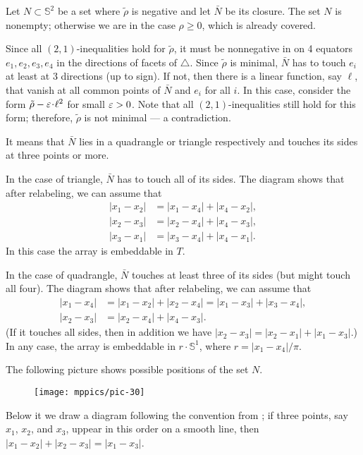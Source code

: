 \documentclass[a4paper,10pt]{article}
\begin{document}
Let $N\subset \mathbb{S}^2$ be a set where $\tilde\rho$ is negative and let $\bar N$ be its closure.
The set $N$ is nonempty; otherwise we are in the case $\rho\ge 0$, which is already covered.

Since all $(2,1)$-inequalities hold for $\tilde\rho$,
it must be nonnegative in on 4 equators $e_1,e_2,e_3,e_4$ in the directions of facets of $\triangle$.
Since $\tilde\rho$ is minimal, $\bar N$ has to touch $e_i$ at least at 3 directions (up to sign). 
If not, then there is a linear function, say $\ell$, that vanish at all common points of $\bar N$ and $e_i$ for all $i$.
In this case, consider the form $\tilde\rho-\eps\cdot \ell^2$ for small $\varepsilon>0$.
Note that all $(2,1)$-inequalities still hold for this form;
therefore, $\tilde\rho$ is not minimal --- a contradiction.

It means that $\bar N$ lies in a quadrangle or triangle respectively and touches its sides at three points or more.

In the case of triangle, $\bar N$ has to touch all of its sides.
The diagram shows that after relabeling, we can assume that 
\begin{align*}
|x_1-x_2|&=|x_1-x_4|+|x_4-x_2|,
\\
|x_2-x_3|&=|x_2-x_4|+|x_4-x_3|,
\\
|x_3-x_1|&=|x_3-x_4|+|x_4-x_1|.
\end{align*}
In this case the array is embeddable in $T$.

In the case of quadrangle, $\bar N$ touches at least three of its sides (but might touch all four).
The diagram shows that after relabeling, we can assume that 
\begin{align*}
|x_1-x_4|&=|x_1-x_2|+|x_2-x_4|=|x_1-x_3|+|x_3-x_4|,
\\
|x_2-x_3|&=|x_2-x_4|+|x_4-x_3|.
\end{align*}
(If it touches all sides, then in addition we have $|x_2-x_3|=|x_2-x_1|+|x_1-x_3|$.)
In any case, the array is embeddable in $r\cdot \mathbb{S}^1$, where $r=|x_1-x_4|/\pi$.
\qeds

The following picture shows possible positions of the set $N$.
\begin{figure}[h!]
\centering
\vskip-0mm
\texttt{[image: mppics/pic-30]}
\vskip-0mm
\end{figure}
Below it we draw a diagram following the convention from \cite{lebedeva-petrunin-2010};
if three points, say $x_1$, $x_2$, and $x_3$, uppear in this order on a smooth line, then $|x_1-x_2|+|x_2-x_3|=|x_1-x_3|$.
\end{document}
